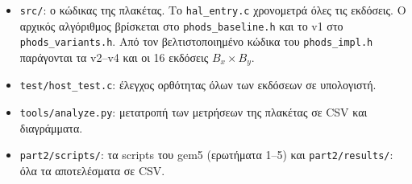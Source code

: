 \documentclass[11pt,a4paper]{article}
\begin{document}
\begin{itemize}
\item \texttt{src/}: ο κώδικας της πλακέτας. Το \texttt{hal\_entry.c} χρονομετρά όλες τις
      εκδόσεις. Ο αρχικός αλγόριθμος βρίσκεται στο \texttt{phods\_baseline.h} και το v1 στο
      \texttt{phods\_variants.h}. Από τον βελτιστοποιημένο κώδικα του \texttt{phods\_impl.h}
      παράγονται τα v2--v4 και οι 16 εκδόσεις $B_x \times B_y$.
\item \texttt{test/host\_test.c}: έλεγχος ορθότητας όλων των εκδόσεων σε υπολογιστή.
\item \texttt{tools/analyze.py}: μετατροπή των μετρήσεων της πλακέτας σε CSV και διαγράμματα.
\item \texttt{part2/scripts/}: τα scripts του gem5 (ερωτήματα 1--5) και
      \texttt{part2/results/}: όλα τα αποτελέσματα σε CSV.
\end{itemize}
\end{document}
